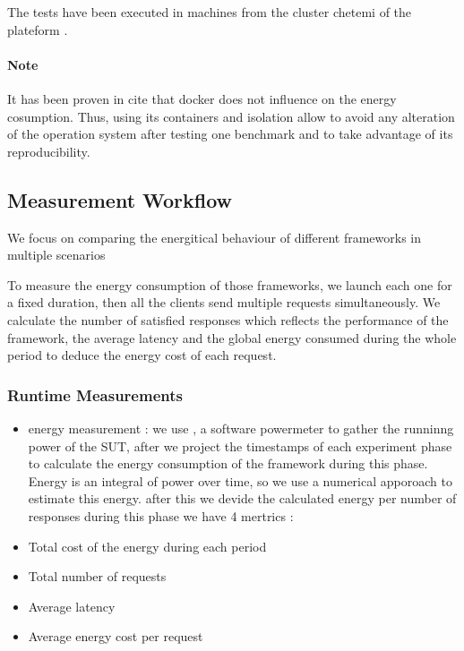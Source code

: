 The tests have been executed in machines from the cluster chetemi of the  plateform .

\paragraph{Note}
It has been proven in {cite } that docker does not influence on the energy cosumption. Thus, using its containers and isolation allow to avoid any alteration of the operation system after testing one benchmark and to take advantage of its reproducibility.

\subsection{Measurement Workflow}
We focus on comparing the energitical behaviour of different frameworks in multiple scenarios

To measure the energy consumption of those frameworks, we launch each one for a fixed duration, then all the clients send multiple requests simultaneously.
We calculate %
the number of satisfied responses which reflects the performance of the framework, the average latency and the global energy consumed during the whole period to deduce the energy cost of each request.


\subsubsection{Runtime Measurements}
\begin{itemize}
    \item energy measurement :
          we use , a software powermeter  to gather the runninng power of the SUT, after we project the timestamps of each experiment phase to calculate the energy consumption of the framework during this phase.
          Energy is an integral of power over time, so we use a numerical apporoach to estimate this energy. 
          after this we devide the calculated energy per number of responses
          during this phase
          we have 4 mertrics :

    \item Total cost of the energy during each period
    \item Total number of requests
    \item Average latency
    \item Average energy cost per request
\end{itemize}

